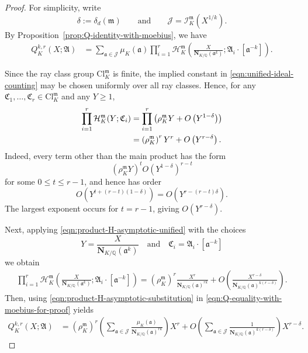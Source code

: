 \documentclass[11pt, reqno]{amsart}
\numberwithin{equation}{section}
\newcommand{\Q}{\mathbb{Q}}
\newcommand{\Nrm}[2]{\mathbf{N}_{#1}(#2)}
\theoremstyle{definition}
\begin{document}
\begin{proof}
For simplicity, write
\[
\delta:=\delta_d(\mathfrak{m})
\qquad\text{and}\qquad
\mathcal{J}
=
\mathcal{I}_K^{\mathfrak{m}}\left(X^{1/k}\right).
\]
By Proposition~\ref{prop:Q-identity-with-moebius}, we have
\begin{align}\label{eqn:Q-equality-with-moebius-for-proof}
Q_K^{k,r}(X;\boldsymbol{\mathfrak{A}})
&=
\sum_{\mathfrak{a}\in\mathcal{J}}
\mu_K(\mathfrak{a})
\prod_{i=1}^{r}
\mathcal{H}_K^{\mathfrak{m}}
\left(
\frac{X}{\Nrm{K/\Q}{\mathfrak{a}^k}};
\mathfrak{A}_i\cdot[\mathfrak{a}^{-k}]
\right).
\end{align}

Since the ray class group $\mathrm{Cl}_K^{\mathfrak{m}}$ is finite,
the implied constant in \eqref{eqn:unified-ideal-counting} may be
chosen uniformly over all ray classes. Hence, for any
$\mathfrak{C}_1,\ldots,\mathfrak{C}_r
\in\mathrm{Cl}_K^{\mathfrak{m}}$ and any $Y\geq1$,
\begin{align}
\prod_{i=1}^{r}
\mathcal{H}_K^{\mathfrak{m}}(Y;\mathfrak{C}_i)
&=
\prod_{i=1}^{r}
\left(
\rho_K^{\mathfrak{m}}Y
+
O\left(Y^{1-\delta}\right)
\right)
\notag\\
&=
\left(\rho_K^{\mathfrak{m}}\right)^rY^r
+
O\left(Y^{r-\delta}\right).
\label{eqn:product-H-asymptotic-unified}
\end{align}
Indeed, every term other than the main product has the form
\[
\left(\rho_K^{\mathfrak{m}}Y\right)^t
O\left(Y^{1-\delta}\right)^{r-t}
\]
for some $0\leq t\leq r-1$, and hence has order
\[
O\left(
Y^{t+(r-t)(1-\delta)}
\right)
=
O\left(
Y^{r-(r-t)\delta}
\right).
\]
The largest exponent occurs for $t=r-1$, giving
$O(Y^{r-\delta})$.

Next, applying \eqref{eqn:product-H-asymptotic-unified} with the choices
\[
Y
=
\frac{X}{\Nrm{K/\Q}{\mathfrak{a}^k}} \quad \text{and} \quad \mathfrak{C}_i
=
\mathfrak{A}_i\cdot[\mathfrak{a}^{-k}]
\]
we obtain
\begin{align}\label{eqn:product-H-asymptotic-substitution}
\prod_{i=1}^{r}
\mathcal{H}_K^{\mathfrak{m}}
\left(
\frac{X}{\Nrm{K/\Q}{\mathfrak{a}^k}};
\mathfrak{A}_i\cdot[\mathfrak{a}^{-k}]
\right) =
\left(\rho_K^{\mathfrak{m}}\right)^r
\frac{X^r}
{\Nrm{K/\Q}{\mathfrak{a}}^{rk}}
+
O\left(
\frac{X^{r-\delta}}
{\Nrm{K/\Q}{\mathfrak{a}}^{k(r-\delta)}}
\right).
\end{align}
Then, using \eqref{eqn:product-H-asymptotic-substitution} in
\eqref{eqn:Q-equality-with-moebius-for-proof} yields
\begin{align}
Q_K^{k,r}(X;\boldsymbol{\mathfrak{A}})
&=
\left(\rho_K^{\mathfrak{m}}\right)^r
\left( \sum_{\mathfrak{a}\in\mathcal{J}}
\frac{\mu_K(\mathfrak{a})}
{\Nrm{K/\Q}{\mathfrak{a}}^{rk}}
\right)X^r + O\left( \sum_{\mathfrak{a}\in\mathcal{J}}
\frac{1}{\Nrm{K/\Q}{\mathfrak{a}}^{k(r-\delta)}}\right)
X^{r-\delta}.
\label{eqn:Q-expression-with-two-sums}
\end{align}


\end{proof}
\end{document}
